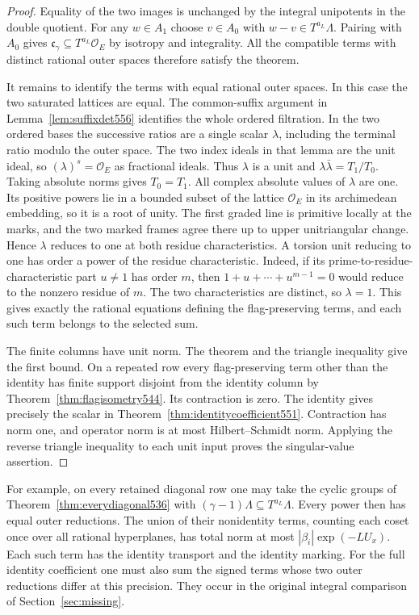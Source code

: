 \documentclass[a4paper,11pt]{article}
\theoremstyle{definition}
\theoremstyle{remark}
\numberwithin{equation}{section}
\begin{document}
\begin{proof}
Equality of the two images is unchanged by the integral
unipotents in the double quotient. For any \(w\in A_1\) choose
\(v\in A_0\) with \(w-v\in T^{a_L}\Lambda\). Pairing with
\(A_0\) gives \(\mathfrak c_\gamma\subseteq T^{a_L}\mathcal O_E\)
by isotropy and integrality. All the compatible terms with
distinct rational outer spaces therefore satisfy the theorem.

It remains to identify the terms with equal rational outer
spaces. In this case the two saturated lattices are equal.
The common-suffix argument in Lemma~\ref{lem:suffixdet556}
identifies the whole ordered filtration. In the two ordered
bases the successive ratios are a single scalar \(\lambda\),
including the terminal ratio modulo the outer space. The two
index ideals in that lemma are the unit ideal, so
\((\lambda)^s=\mathcal O_E\) as fractional ideals.
Thus \(\lambda\) is a unit and
\(\lambda\bar\lambda=T_1/T_0\). Taking absolute norms gives
\(T_0=T_1\). All complex absolute values of \(\lambda\)
are one. Its positive powers lie in a bounded subset of the
lattice \(\mathcal O_E\) in its archimedean embedding, so it
is a root of unity. The first graded line is primitive
locally at the marks, and the two marked frames agree there
up to upper unitriangular change. Hence \(\lambda\) reduces
to one at both residue characteristics. A torsion unit reducing
to one has order a power of the residue characteristic. Indeed,
if its prime-to-residue-characteristic part \(u\ne1\) has order
\(m\), then \(1+u+\cdots+u^{m-1}=0\) would reduce to the
nonzero residue of \(m\). The two characteristics are distinct,
so \(\lambda=1\). This gives exactly the rational equations
defining the flag-preserving terms, and each such term belongs
to the selected sum.

The finite columns have unit norm. The theorem and the triangle
inequality give the first bound. On a repeated row every
flag-preserving term other than the identity has finite support
disjoint from the identity column by
Theorem~\ref{thm:flagisometry544}. Its contraction is zero.
The identity gives precisely the scalar in
Theorem~\ref{thm:identitycoefficient551}. Contraction has norm
one, and operator norm is at most Hilbert--Schmidt norm. Applying
the reverse triangle inequality to each unit input proves the
singular-value assertion.
\end{proof}

For example, on every retained diagonal row one may take the
cyclic groups of Theorem~\ref{thm:everydiagonal536} with
\((\gamma-1)\Lambda\subseteq T^{a_L}\Lambda\). Every power then
has equal outer reductions. The union of their nonidentity
terms, counting each coset once over all rational hyperplanes,
has total norm at most \(|\beta_i|\exp(-LU_x)\). Each such term
has the identity transport and the identity marking. For the
full identity coefficient one must also sum the signed terms
whose two outer reductions differ at this precision. They
occur in the original integral comparison of Section~\ref{sec:missing}.
\end{document}
